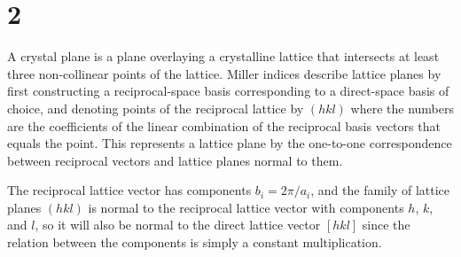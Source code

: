 \documentclass{article}
\begin{document}
\section*{2}
A crystal plane is a plane overlaying a crystalline lattice that intersects at least three non-collinear points of the lattice.
Miller indices describe lattice planes by first constructing a reciprocal-space basis corresponding to a direct-space basis
of choice, and denoting points of the reciprocal lattice by $(hkl)$ where the numbers are the coefficients of the linear combination of
the reciprocal basis vectors that equals the point.
This represents a lattice plane by the one-to-one correspondence between reciprocal vectors and lattice planes normal to them.

The reciprocal lattice vector has components $b_{i}=2\pi/a_{i}$, and the family of lattice planes $(hkl)$ is normal to the reciprocal
lattice vector with components $h$, $k$, and $l$, so it will also be normal to the direct lattice vector $[hkl]$ since the relation
between the components is simply a constant multiplication.

\end{document}
